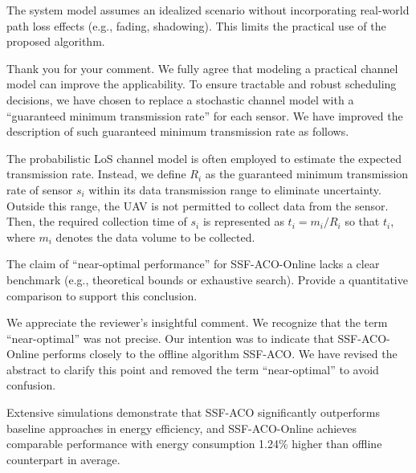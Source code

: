 \begin{revcomment}
	The system model assumes an idealized scenario without incorporating real-world path loss effects (e.g., fading, shadowing). This limits the practical use of the proposed algorithm.
\end{revcomment}
\begin{revresponse}
	Thank you for your comment.
	We fully agree that modeling a practical channel model can improve the applicability.
	To ensure tractable and robust scheduling decisions, we have chosen to replace a stochastic channel model with a ``guaranteed minimum transmission rate'' for each sensor.
	We have improved the description of such guaranteed minimum transmission rate as follows.

	\begin{changes}
		The probabilistic LoS channel model is often employed to estimate the expected transmission rate.
		Instead, we define $R_i$ as the guaranteed minimum transmission rate of sensor $s_i$ within its data transmission range to eliminate uncertainty.
		Outside this range, the UAV is not permitted to collect data from the sensor.
		Then, the required collection time of $s_i$ is represented as $t_i=m_i/R_i$ so that $t_i$, where $m_i$ denotes the data volume to be collected.
	\end{changes}
\end{revresponse}

\begin{revcomment}
	The claim of ``near-optimal performance'' for SSF-ACO-Online lacks a clear benchmark (e.g., theoretical bounds or exhaustive search). Provide a quantitative comparison to support this conclusion.
\end{revcomment}
\begin{revresponse}
	We appreciate the reviewer's insightful comment.
	We recognize that the term ``near-optimal'' was not precise. Our intention was to indicate that SSF-ACO-Online performs closely to the offline algorithm SSF-ACO. We have revised the abstract to clarify this point and removed the term ``near-optimal'' to avoid confusion.
	\begin{changes}
		Extensive simulations demonstrate that SSF-ACO significantly outperforms baseline approaches in energy efficiency, and SSF-ACO-Online achieves comparable performance with energy consumption 1.24\% higher than offline counterpart in average.
	\end{changes}
\end{revresponse}


